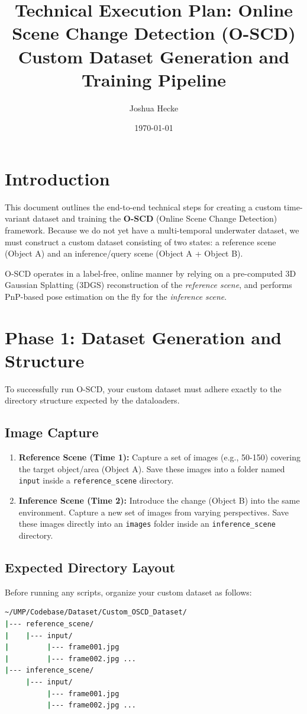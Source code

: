 \documentclass{article}
\title{Technical Execution Plan: Online Scene Change Detection (O-SCD)\\
\large Custom Dataset Generation and Training Pipeline}
\author{Joshua Hecke}
\date{\today}
\begin{document}
\maketitle

\section{Introduction}
This document outlines the end-to-end technical steps for creating a custom time-variant dataset and training the \textbf{O-SCD} (Online Scene Change Detection) framework. Because we do not yet have a multi-temporal underwater dataset, we must construct a custom dataset consisting of two states: a reference scene (Object A) and an inference/query scene (Object A + Object B).

O-SCD operates in a label-free, online manner by relying on a pre-computed 3D Gaussian Splatting (3DGS) reconstruction of the \textit{reference scene}, and performs PnP-based pose estimation on the fly for the \textit{inference scene}.

\section{Phase 1: Dataset Generation and Structure}
To successfully run O-SCD, your custom dataset must adhere exactly to the directory structure expected by the dataloaders.

\subsection{Image Capture}
\begin{enumerate}
    \item \textbf{Reference Scene (Time 1):} Capture a set of images (e.g., 50-150) covering the target object/area (Object A). Save these images into a folder named \texttt{input} inside a \texttt{reference\_scene} directory.
    \item \textbf{Inference Scene (Time 2):} Introduce the change (Object B) into the same environment. Capture a new set of images from varying perspectives. Save these images directly into an \texttt{images} folder inside an \texttt{inference\_scene} directory.
\end{enumerate}

\subsection{Expected Directory Layout}
Before running any scripts, organize your custom dataset as follows:
\begin{lstlisting}[language=bash]
~/UMP/Codebase/Dataset/Custom_OSCD_Dataset/
|--- reference_scene/
|    |--- input/
|         |--- frame001.jpg
|         |--- frame002.jpg ...
|--- inference_scene/
     |--- input/
          |--- frame001.jpg
          |--- frame002.jpg ...
\end{lstlisting}
\end{document}
